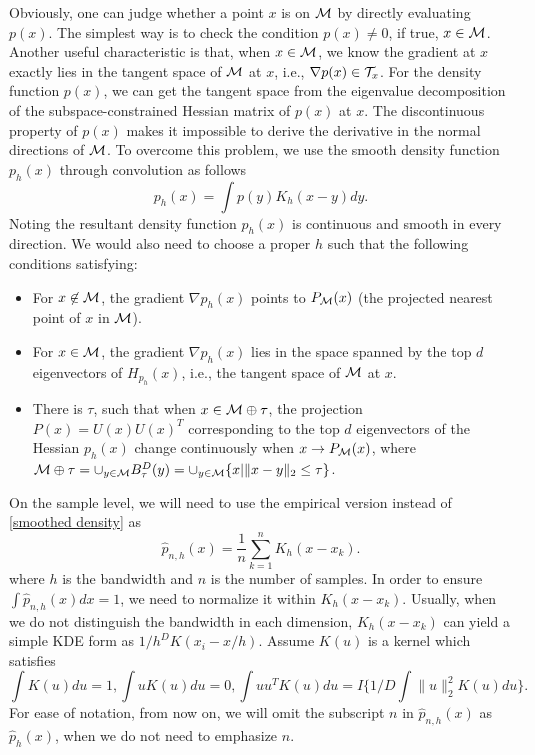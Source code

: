 \documentclass[aos,preprint]{imsart}
\theoremstyle{remark}
\begin{document}
Obviously, one can judge whether a point $x$ is on $\cal M$ by directly evaluating $p(x)$. The simplest way is to check the condition $p(x)\not = 0$, if true, $x\in \cal M$. Another useful characteristic is that, when $x\in \cal M$, we know the gradient at $x$ exactly lies in the tangent space of $\cal M$ at $x$, i.e., $\nabla p(x)\in {\cal T}_x$. For the density function $p(x)$, we can get the tangent space from the eigenvalue decomposition of the subspace-constrained Hessian matrix of $p(x)$ at $x$. The discontinuous property of $p(x)$ makes it impossible to derive the derivative in the normal directions of $\cal M$. To overcome this problem, we use the smooth density function $p_h(x)$ through convolution as follows
\begin{equation}\label{smoothed density}
p_h(x) = \int p(y) K_h(x-y)dy.
\end{equation}
Noting the resultant density function $p_h(x)$ is continuous and smooth in every direction. We would also need to choose a proper $h$ such that the following conditions satisfying:
\begin{itemize}
\item For $x\not \in \cal M$, the gradient $\nabla p_h(x)$ points to ${P_{\cal M}}(x)$ (the projected nearest point of $x$ in $\cal M$).
\item For $x\in \cal M$, the gradient $\nabla p_h(x)$ lies in the space spanned by the top $d$ eigenvectors of $H_{p_h}(x)$, i.e., the tangent space of $\cal M$ at $x$.
\item There is $\tau$, such that when $x\in \cal M\oplus \tau$, the projection $P(x) = U(x)U(x)^T$ corresponding to the top $d$ eigenvectors of the Hessian $p_h(x)$ change continuously when $x\rightarrow {P_{\cal M}}(x)$, where ${\cal M}\oplus \tau = \cup_{y\in \cal M} B^D_\tau (y)= \cup_{y\in \cal M} \{x|\|x-y\|_2\leq \tau\}$.
\end{itemize}

On the sample level, we will need to use the empirical version instead of \eqref{smoothed density} as
\[
 \hat{p}_{n,h}(x) = \frac{1}{n}\sum_{k=1}^n K_h(x-x_k).
\]
where $h$ is the bandwidth and $n$ is the number of samples. In order to ensure $\int  \hat{p}_{n,h}(x) dx = 1$, we need to normalize it within $K_h(x-x_k)$. Usually, when we do not distinguish the bandwidth in each dimension, $K_h(x-x_k)$ can yield a simple KDE form as ${1}/{h^D} K({x_i-x}/{h})$. Assume $K(u)$ is a kernel which satisfies
\[
\int K(u) du = 1, \int u K(u) du = 0, \int uu^T K(u) du= I \{{1}/{D} \int \|u\|_2^2 K(u) du\} .
\]
For ease of notation, from now on, we will omit the subscript $n$ in $ \hat{p}_{n,h}(x)$ as $\hat{p}_h(x)$, when we do not need to emphasize $n$.
\end{document}
